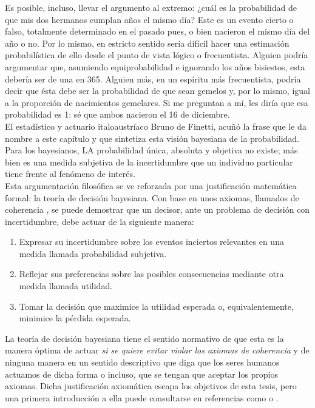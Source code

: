 	Es posible, incluso, llevar el argumento al extremo: ¿cuál es la probabilidad de que mis dos hermanos cumplan años el mismo día? Este es un evento cierto o falso, totalmente determinado en el pasado pues, o bien nacieron el mismo día del año o no. Por lo mismo, en estricto sentido sería difícil hacer una estimación probabilística de ello desde el punto de vista lógico o frecuentista. Alguien podría argumentar que, asumiendo equiprobabilidad e ignorando los años bisiestos, esta debería ser de una en 365. Alguien más, en un espíritu más frecuentista, podría decir que ésta debe ser la probabilidad de que sean gemelos y, por lo mismo, igual a la proporción de nacimientos gemelares. Si me preguntan a mí, les diría que esa probabilidad es 1: sé que ambos nacieron el 16 de diciembre.\\	
	
	El estadístico y actuario italoaustríaco Bruno de Finetti, acuñó la frase que le da nombre a este capítulo y que sintetiza esta visión bayesiana de la probabilidad. Para los bayesianos, LA probabilidad única, absoluta y objetiva no existe; más bien es una medida subjetiva de la incertidumbre que un individuo particular tiene frente al fenómeno de interés.\\ 
	
	
	Esta argumentación filosófica se ve reforzada por una justificación matemática formal: la teoría de decisión bayesiana. Con base en unos axiomas, llamados de coherencia , se puede demostrar que un decisor, ante un problema de decisión con incertidumbre, debe actuar de la siguiente manera:

\begin{enumerate}
\item Expresar su incertidumbre sobre los eventos inciertos relevantes en una medida llamada probabilidad subjetiva.
\item Reflejar sus preferencias sobre las posibles consecuencias mediante otra medida llamada utilidad. 
\item Tomar la decisión que maximice la utilidad esperada o, equivalentemente, minimice la pérdida esperada. 
\end{enumerate}   
	
La teoría de decisión bayesiana tiene el sentido normativo de que esta es la manera óptima de actuar \textit{si se quiere evitar violar los axiomas de coherencia} y de ninguna manera en un sentido descriptivo que diga que los seres humanos actuamos de dicha forma o incluso, que se tengan que aceptar los propios axiomas. Dicha justificación axiomática escapa los objetivos de esta tesis, pero una primera introducción a ella puede consultarse en referencias como \textcite{Mendoza11} o \textcite{Bernardo81}.\\

